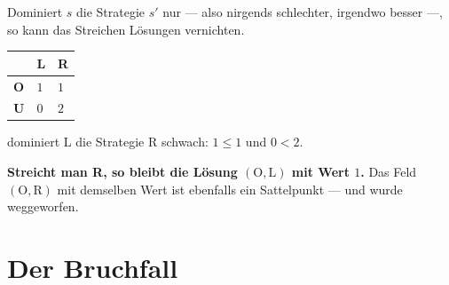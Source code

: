 \begin{warnung}
Dominiert $s$ die Strategie $s'$ nur  --- also nirgends schlechter, irgendwo besser ---, so kann das Streichen Lösungen vernichten.

\begin{center}
{\small
\renewcommand{\arraystretch}{1.5}
\begin{tabular}{@{}P{1.6cm}P{1.4cm}P{1.4cm}@{}}
\toprule
& \textbf{L} & \textbf{R}\\
\midrule
\textbf{O} & $1$ & $1$\\
\textbf{U} & $0$ & $2$\\
\bottomrule
\end{tabular}}
\end{center}

 dominiert L die Strategie R schwach: $1 \le 1$ und $0 < 2$.

\begin{center}
\begin{minipage}{0.9\textwidth}
\textbf{Streicht man R, so bleibt die Lösung $(\text{O},\text{L})$ mit Wert $1$.} Das Feld $(\text{O},\text{R})$ mit demselben Wert ist ebenfalls ein Sattelpunkt --- und wurde weggeworfen.
\end{minipage}
\end{center}

\begin{center}
\begin{minipage}{0.88\textwidth}
\end{minipage}
\end{center}
\end{warnung}

\section{Der Bruchfall}

